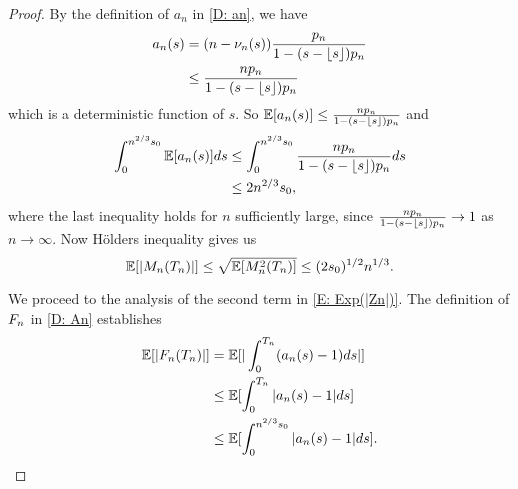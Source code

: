 \begin{proof}
	By the definition of $a_n$ in \eqref{D: an}, we have
	\begin{equation}
	\begin{aligned}
	a_n(s) &= (n - \nu_n(s)) \frac{p_n}{1 - (s - \lfloor s\rfloor)p_n} \\
	&\leq \frac{n p_n}{1 - (s - \lfloor s\rfloor)p_n}
	\end{aligned}
	\end{equation}
	which is a deterministic function of $s$. So
	$ \mathbb{E}[a_n(s)] \leq \frac{n p_n}{1 - (s - \lfloor s\rfloor)p_n} $
	and
	\begin{equation}
	\begin{aligned}
	\int_{0}^{n^{2 / 3}s_0} \mathbb{E}[a_n(s)] ds 
	&\leq \int_{0}^{n^{2 / 3}s_0}\frac{n p_n}{1 - (s - \lfloor s\rfloor)p_n}ds \\
	&\leq 2n^{2 / 3}s_0,
	\end{aligned}
	\end{equation}
	where the last inequality holds for $n$ sufficiently large, since 
	$\frac{n p_n}{1 - (s - \lfloor s\rfloor)p_n} \rightarrow 1$
	as $n \rightarrow \infty$.
	Now Hölders inequality gives us
	\begin{equation} \label{E: Exp(Mn)}
	\mathbb{E}[|M_n(T_n)|] \leq \sqrt{\mathbb{E}[M^2_n(T_n)]} \leq (2s_0)^{1/2}n^{1 / 3}.
	\end{equation}
	
	We proceed to the analysis of the second term in \eqref{E: Exp(|Zn|)}.
	The definition of $F_n$ in \eqref{D: An} establishes
	\begin{equation}
	\begin{aligned}
	\mathbb{E}[|F_n(T_n)|] 
	&= \mathbb{E}[|\int_{0}^{T_n}(a_n(s) -1)ds |] \\
	&\leq \mathbb{E}[\int_{0}^{T_n} |a_n(s)-1|ds] \\
	&\leq \mathbb{E}[\int_{0}^{n^{2 / 3}s_0} |a_n(s)-1|ds].
	\end{aligned}
	\end{equation}
	

\end{proof}
